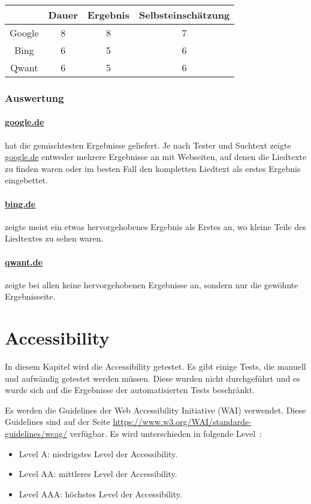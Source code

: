 \begin{tabular}{|c|c|c|c|}
    \hline
    & Dauer & Ergebnis & Selbsteinschätzung \\
    \hline
    Google & 8     & 8       & 7                  \\
    \hline
    Bing   & 6     & 5        & 6                  \\
    \hline
    Qwant  & 6     & 5        & 6                  \\
    \hline
\end{tabular}

\subsubsection*{Auswertung}
\paragraph{\url{google.de}} hat die gemischtesten Ergebnisse geliefert.
Je nach Tester und Suchtext zeigte \url{google.de} entweder mehrere Ergebnisse an mit Webseiten,
auf denen die Liedtexte zu finden waren oder im besten Fall den kompletten Liedtext als erstes Ergebnis eingebettet.
\paragraph{\url{bing.de}} zeigte meist ein etwas hervorgehobenes Ergebnis als Erstes an, wo kleine Teile des Liedtextes zu sehen waren.
\paragraph{\url{qwant.de}} zeigte bei allen keine hervorgehobenen Ergebnisse an, sondern nur die gewöhnte Ergebnisseite.

\section{Accessibility}\label{sec:accessibility}
In diesem Kapitel wird die Accessibility getestet.
Es gibt einige Tests, die manuell und aufwändig getestet werden müssen.
Diese wurden nicht durchgeführt und es wurde sich auf die Ergebnisse der automatisierten Tests beschränkt.

Es werden die Guidelines der Web Accessibility Initiative (WAI) verwendet.
Diese Guidelines sind auf der Seite \url{https://www.w3.org/WAI/standards-guidelines/wcag/} verfügbar.\newline
Es wird unterschieden in folgende Level~\autocite{WCAG21}:
\begin{itemize}
    \item Level A: niedrigstes Level der Accessibility.
    \item Level AA: mittleres Level der Accessibility.
    \item Level AAA: höchstes Level der Accessibility.
\end{itemize}

